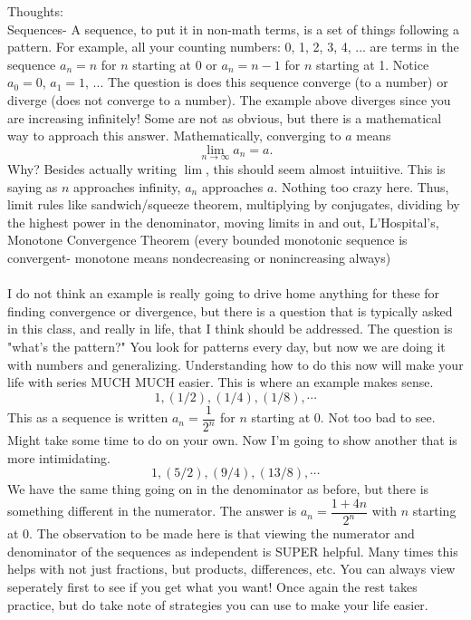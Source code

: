 \documentclass[10pt]{article}
\theoremstyle{Theorem}
\theoremstyle{definition}
\theoremstyle{remark}
\theoremstyle{custom}
\begin{document}
\thispagestyle{firststyle}
\pagestyle{plain}


\noindent Thoughts: \\
Sequences- A sequence, to put it in non-math terms, is a set of things following a pattern. For example, all your counting numbers: 0, 1, 2, 3, 4, ... are terms in the sequence $a_n=n$ for $n$ starting at 0 or $a_n=n-1$ for $n$ starting at 1. Notice $a_0=0$, $a_1=1$, ... The question is does this sequence converge (to a number) or diverge (does not converge to a number). The example above diverges since you are increasing infinitely! Some are not as obvious, but there is a mathematical way to approach this answer. Mathematically, converging to $a$ means
\[
\lim_{n\rightarrow \infty}a_n=a.
\]
Why? Besides actually writing $\lim$, this should seem almost intuiitive. This is saying as $n$ approaches infinity, $a_n$ approaches $a$. Nothing too crazy here. Thus, limit rules like  sandwich/squeeze theorem, multiplying by conjugates, dividing by the highest power in the denominator, moving limits in and out, L'Hospital's, Monotone Convergence Theorem (every bounded monotonic sequence is convergent- monotone means nondecreasing or nonincreasing always)\\\\
I do not think an example is really going to drive home anything for these for finding convergence or divergence, but there is a question that is typically asked in this class, and really in life, that I think should be addressed.  The question is "what's the pattern?" You look for patterns every day, but now we are doing it with numbers and generalizing. Understanding how to do this now will make your life with series MUCH MUCH easier. This is where an example makes sense.
\[
1, (1/2), (1/4), (1/8), \cdots
\]
This as a sequence is written $a_n=\dfrac{1}{2^n}$ for $n$ starting at 0. Not too bad to see. Might take some time to do on your own. Now I'm going to show another that is more intimidating.
\[
1, (5/2), (9/4), (13/8), \cdots
\]
We have the same thing going on in the denominator as before, but there is something different in the numerator. The answer is $a_n=\dfrac{1+4n}{2^n}$ with $n$ starting at 0. The observation to be made here is that viewing the numerator and denominator of the sequences as independent is SUPER helpful. Many times this helps with not just fractions, but products, differences, etc. You can always view seperately first to see if you get what you want! Once again the rest takes practice, but do take note of strategies you can use to make your life easier.\\\\
\end{document}
